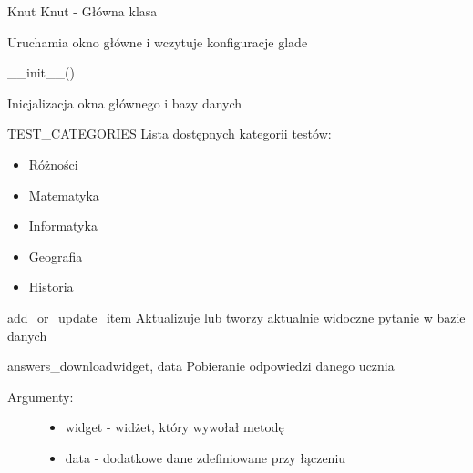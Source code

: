 \documentclass[letterpaper,10pt,polish]{manual}
\begin{document}
\hypertarget{Knut.Knut}{}\begin{classdesc}{Knut}{}
Knut - Główna klasa

Uruchamia okno główne i wczytuje konfiguracje glade

\_\_init\_\_()

Inicjalizacja okna głównego i bazy danych

\hypertarget{Knut.Knut.TEST\_CATEGORIES}{}\begin{memberdesc}{TEST\_CATEGORIES}
Lista dostępnych kategorii testów:
\begin{itemize}
\item {} 
Różności

\item {} 
Matematyka

\item {} 
Informatyka

\item {} 
Geografia

\item {} 
Historia

\end{itemize}
\end{memberdesc}

\hypertarget{Knut.Knut.add\_or\_update\_item}{}\begin{methoddesc}{add\_or\_update\_item}{}
Aktualizuje lub tworzy aktualnie widoczne pytanie w bazie danych
\end{methoddesc}

\hypertarget{Knut.Knut.answers\_download}{}\begin{methoddesc}{answers\_download}{widget, data}
Pobieranie odpowiedzi danego ucznia
\begin{description}
\item[Argumenty:] \leavevmode\begin{itemize}
\item {} 
widget - widżet, który wywołał metodę

\item {} 
data  - dodatkowe dane zdefiniowane przy łączeniu

\end{itemize}

\end{description}
\end{methoddesc}


\end{classdesc}
\end{document}
